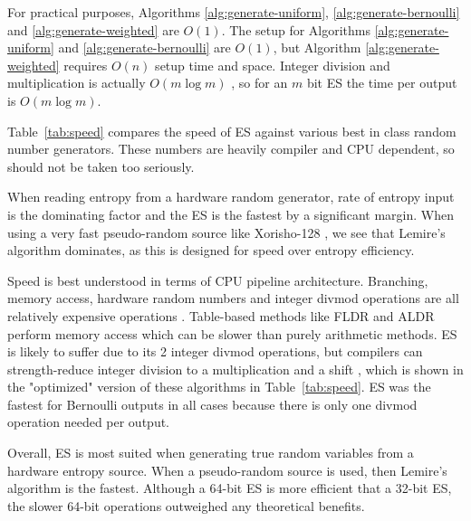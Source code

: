 \documentclass[lettersize,onecolumn]{IEEEtran}
\begin{document}
For practical purposes, Algorithms \ref{alg:generate-uniform}, \ref{alg:generate-bernoulli} and \ref{alg:generate-weighted} are $O(1)$.
The setup for Algorithms \ref{alg:generate-uniform} and \ref{alg:generate-bernoulli} are $O(1)$, but Algorithm \ref{alg:generate-weighted} requires $O(n)$ setup time and space. Integer division and multiplication is actually $O(m \log m)$ \cite{harvey2021integer}, so for an $m$ bit ES the time per output is $O(m \log m)$. 

Table~\ref{tab:speed} compares the speed of ES against various best in class random number generators. These numbers are heavily compiler and CPU dependent, so should not be taken too seriously.

When reading entropy from a hardware random generator, rate of entropy input is the dominating factor and the ES is the fastest by a significant margin. When using a very fast pseudo-random source like Xorisho-128 \cite{blackman21}, we see that Lemire's algorithm \cite{lemire2019fast} dominates, as this is designed for speed over entropy efficiency.

Speed is best understood in terms of CPU pipeline architecture. Branching, memory access, hardware random numbers and integer divmod operations are all relatively expensive operations \cite{Abel19a}. Table-based methods like FLDR \cite{saad2020fldr} and ALDR \cite{saad2025} perform memory access which can be slower than purely arithmetic methods. ES is likely to suffer due to its 2 integer divmod operations, but compilers can strength-reduce integer division to a multiplication and a shift \cite{granlund94}, which is shown in the "optimized" version of these algorithms in Table~\ref{tab:speed}. ES was the fastest for Bernoulli outputs in all cases because there is only one divmod operation needed per output.

Overall, ES is most suited when generating true random variables from a hardware entropy source. When a pseudo-random source is used, then Lemire's algorithm is the fastest. Although a 64-bit ES is more efficient that a 32-bit ES, the slower 64-bit operations outweighed any theoretical benefits.
\end{document}
